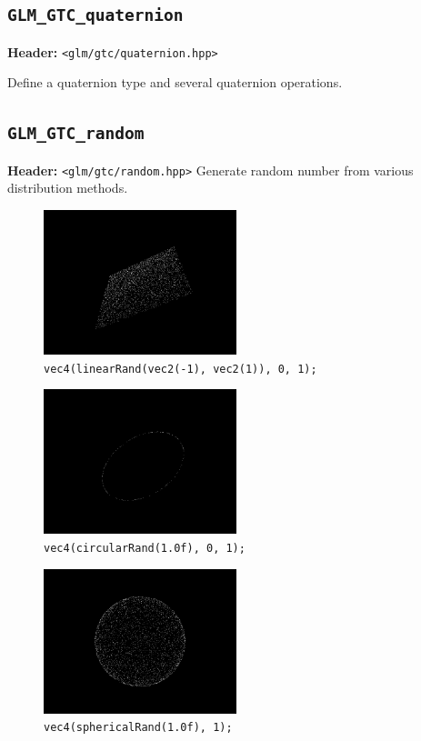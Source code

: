 \documentclass{scrartcl}
\numberwithin{figure}{subsection}
\begin{document}
\subsection{\texttt{GLM\_GTC\_quaternion}}
\textbf{Header:} \verb|<glm/gtc/quaternion.hpp>|

Define a quaternion type and several quaternion operations.

\subsection{\texttt{GLM\_GTC\_random}}
\textbf{Header:} \verb|<glm/gtc/random.hpp>|
Generate random number from various distribution methods.

\begin{figure}[h]
  \centering
  \includegraphics[width=0.5\textwidth]{linearrand}
  \cprotect\caption{\verb|vec4(linearRand(vec2(-1), vec2(1)), 0, 1);|}
\end{figure}

\begin{figure}[h]
  \centering
  \includegraphics[width=0.5\textwidth]{circularrand}
  \cprotect\caption{\verb|vec4(circularRand(1.0f), 0, 1);|}
\end{figure}

\begin{figure}[h]
  \centering
  \includegraphics[width=0.5\textwidth]{sphericalrand}
  \cprotect\caption{\verb|vec4(sphericalRand(1.0f), 1);|}
\end{figure}
\end{document}
